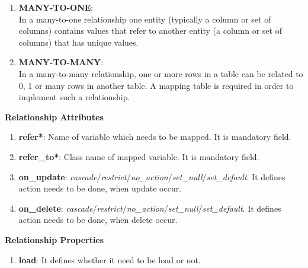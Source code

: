 \begin{enumerate}
\begin{enumerate}
			\item \small \textbf{MANY-TO-ONE}: \textit{\[<many-to-one>\]} In a many-to-one relationship one entity (typically a column or set of columns) contains values that refer to another entity (a column or set of columns) that has unique values.
	
			\item \small \textbf{MANY-TO-MANY}: \textit{\[<many-to-many>\]} In a many-to-many relationship, one or more rows in a table can be related to 0, 1 or many rows in another table. A mapping table is required in order to implement such a relationship.
	
		\end{enumerate}

			
		\textbf{Relationship Attributes}

		\begin{enumerate}

			\item \small \textbf{refer*}: Name of variable which needs to be mapped. It is mandatory field.

			\item \small \textbf{refer\_to*}: Class name of mapped variable. It is mandatory field.

			\item \small \textbf{on\_update}: \textit{cascade}/\textit{restrict}/\textit{no\_action}/\textit{set\_null}/\textit{set\_default}. It defines action needs to be done, when update occur.

			\item \small \textbf{on\_delete}: \textit{cascade}/\textit{restrict}/\textit{no\_action}/\textit{set\_null}/\textit{set\_default}. It defines action needs to be done, when delete occur.
		
		\end{enumerate}

		\textbf{Relationship Properties}

		\begin{enumerate}

			\item \small \textbf{load}: It defines whether it need to be load or not.
			
		\end{enumerate}
		
\end{enumerate}

